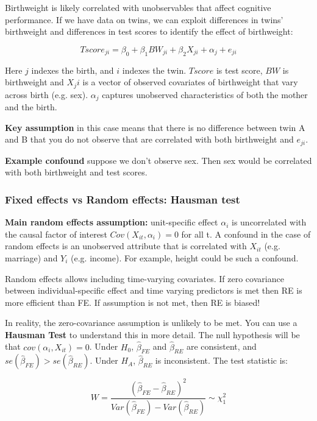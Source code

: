 \documentclass[12 pt, leqno]{article}
\begin{document}
Birthweight is likely correlated with unobservables that affect cognitive performance. If we have data on twins, we can exploit differences in twins' birthweight and differences in test scores to identify the effect of birthweight:

$$Tscore_{ji} = \beta_0 + \beta_1 BW_{ji} + \beta_2 X_{ji} + \alpha_j + e_{ji}$$

Here $j$ indexes the birth, and $i$ indexes the twin. $Tscore$ is test score, $BW$ is birthweight and $X_ji$ is a vector of observed covariates of birthweight that vary across birth (e.g. sex). $\alpha_j$ captures unobserved characteristics of both the mother and the birth. 

\textbf{Key assumption} in this case means that there is no difference between twin A and B that you do not observe that are correlated with both birthweight and $e_{ji}$.

\textbf{Example confound} suppose we don't observe sex. Then sex would be correlated with both birthweight and test scores. 

\subsubsection{Fixed effects vs Random effects: Hausman test}

\textbf{Main random effects assumption:} unit-specific effect $\alpha_i$ is uncorrelated with the causal factor of interest $Cov(X_{it}, \alpha_i) = 0$ for all t. A confound in the case of random effects is an unobserved attribute that is correlated with $X_{it}$ (e.g. marriage) and $Y_i$ (e.g. income). For example, height could be such a confound. 

Random effects allows including time-varying covariates. If zero covariance between individual-specific effect and time varying predictors is met then RE is more efficient than FE. If assumption is not met, then RE is biased!

In reality, the zero-covariance assumption is unlikely to be met. You can use a \textbf{Hausman Test} to understand this in more detail. The null hypothesis will be that $cov(\alpha_i, X_{it}) = 0$. Under $H_0$, $\hat{\beta}_{FE}$ and $\hat{\beta}_{RE}$ are consistent, and $se(\hat{\beta}_{FE}) > se(\hat{\beta}_{RE})$. Under $H_A$, $\hat{\beta}_{RE}$ is inconsistent. The test statistic is:

$$W = \frac{(\hat{\beta}_{FE} - \hat{\beta}_{RE})^2}{Var(\hat{\beta}_{FE}) - Var(\hat{\beta}_{RE})} \sim \chi_1^2$$
\end{document}
